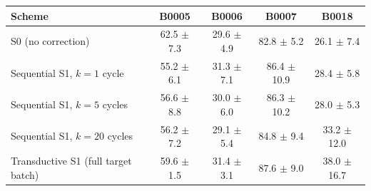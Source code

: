 \begin{tabular}{lcccc}
\toprule
Scheme & B0005 & B0006 & B0007 & B0018 \\
\midrule
S0 (no correction) & 62.5 $\pm$ 7.3 & 29.6 $\pm$ 4.9 & 82.8 $\pm$ 5.2 & 26.1 $\pm$ 7.4 \\
Sequential S1, $k=1$ cycle & 55.2 $\pm$ 6.1 & 31.3 $\pm$ 7.1 & 86.4 $\pm$ 10.9 & 28.4 $\pm$ 5.8 \\
Sequential S1, $k=5$ cycles & 56.6 $\pm$ 8.8 & 30.0 $\pm$ 6.0 & 86.3 $\pm$ 10.2 & 28.0 $\pm$ 5.3 \\
Sequential S1, $k=20$ cycles & 56.2 $\pm$ 7.2 & 29.1 $\pm$ 5.4 & 84.8 $\pm$ 9.4 & 33.2 $\pm$ 12.0 \\
Transductive S1 (full target batch) & 59.6 $\pm$ 1.5 & 31.4 $\pm$ 3.1 & 87.6 $\pm$ 9.0 & 38.0 $\pm$ 16.7 \\
\bottomrule
\end{tabular}
